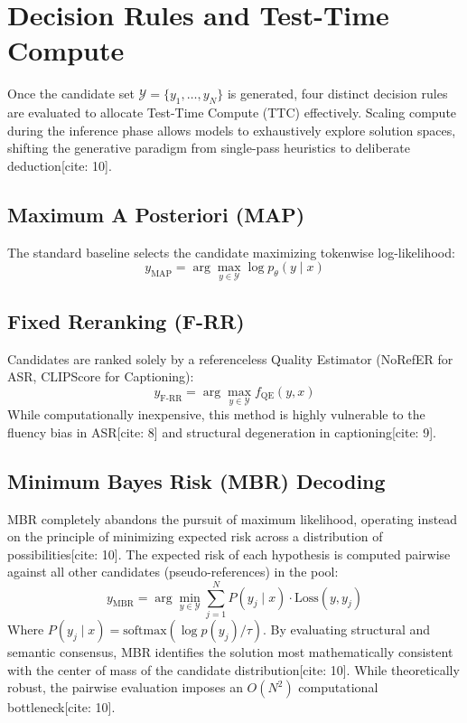 \section{Decision Rules and Test-Time Compute}
\label{sec:decision_rules}

Once the candidate set $\mathcal{Y} = \{y_1,\dots,y_N\}$ is generated, four distinct decision rules are evaluated to allocate Test-Time Compute (TTC) effectively. Scaling compute during the inference phase allows models to exhaustively explore solution spaces, shifting the generative paradigm from single-pass heuristics to deliberate deduction[cite: 10].

\subsection{Maximum A Posteriori (MAP)}
The standard baseline selects the candidate maximizing tokenwise log-likelihood:
$$y_{\text{MAP}} = \arg\max_{y \in \mathcal{Y}} \log p_\theta(y \mid x)$$

\subsection{Fixed Reranking (F-RR)}
Candidates are ranked solely by a referenceless Quality Estimator (NoRefER for ASR, CLIPScore for Captioning):
$$y_{\text{F-RR}} = \arg\max_{y \in \mathcal{Y}} f_{\text{QE}}(y, x)$$
While computationally inexpensive, this method is highly vulnerable to the fluency bias in ASR[cite: 8] and structural degeneration in captioning[cite: 9].

\subsection{Minimum Bayes Risk (MBR) Decoding}
MBR completely abandons the pursuit of maximum likelihood, operating instead on the principle of minimizing expected risk across a distribution of possibilities[cite: 10]. The expected risk of each hypothesis is computed pairwise against all other candidates (pseudo-references) in the pool:
$$y_{\text{MBR}} = \arg\min_{y \in \mathcal{Y}} \sum_{j=1}^N P(y_j \mid x) \cdot \text{Loss}(y, y_j)$$
Where $P(y_j \mid x) = \text{softmax}(\log p(y_j) / \tau)$. By evaluating structural and semantic consensus, MBR identifies the solution most mathematically consistent with the center of mass of the candidate distribution[cite: 10]. While theoretically robust, the pairwise evaluation imposes an $O(N^2)$ computational bottleneck[cite: 10].

